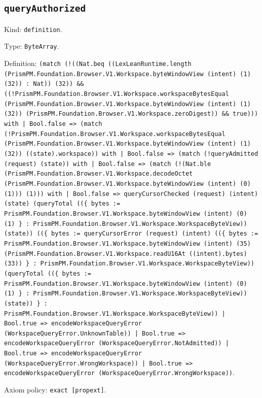 \documentclass[11pt]{article}
\begin{document}
\subsection*{\texttt{queryAuthorized}}
\noindent Kind: \texttt{definition}.\par
\noindent Type: \texttt{ByteArray}.\par
\noindent Definition: \texttt{(match (!((Nat.beq ((LexLeanRuntime.length (PrismPM.Foundation.Browser.V1.Workspace.byteWindowView (intent) (1) (32)) : Nat)) (32)) \&\& ((!PrismPM.Foundation.Browser.V1.Workspace.workspaceBytesEqual (PrismPM.Foundation.Browser.V1.Workspace.byteWindowView (intent) (1) (32)) (PrismPM.Foundation.Browser.V1.Workspace.zeroDigest)) \&\& true))) with | Bool.false => (match (!PrismPM.Foundation.Browser.V1.Workspace.workspaceBytesEqual (PrismPM.Foundation.Browser.V1.Workspace.byteWindowView (intent) (1) (32)) ((state).workspace)) with | Bool.false => (match (!queryAdmitted (request) (state)) with | Bool.false => (match (!(Nat.ble (PrismPM.Foundation.Browser.V1.Workspace.decodeOctet (PrismPM.Foundation.Browser.V1.Workspace.byteWindowView (intent) (0) (1))) (1))) with | Bool.false => queryCursorChecked (request) (intent) (state) (queryTotal ((\{ bytes := PrismPM.Foundation.Browser.V1.Workspace.byteWindowView (intent) (0) (1) \} : PrismPM.Foundation.Browser.V1.Workspace.WorkspaceByteView)) (state)) ((\{ bytes := queryCursorError (request) (intent) ((\{ bytes := PrismPM.Foundation.Browser.V1.Workspace.byteWindowView (intent) (35) (PrismPM.Foundation.Browser.V1.Workspace.readU16At ((intent).bytes) (33)) \} : PrismPM.Foundation.Browser.V1.Workspace.WorkspaceByteView)) (queryTotal ((\{ bytes := PrismPM.Foundation.Browser.V1.Workspace.byteWindowView (intent) (0) (1) \} : PrismPM.Foundation.Browser.V1.Workspace.WorkspaceByteView)) (state)) \} : PrismPM.Foundation.Browser.V1.Workspace.WorkspaceByteView)) | Bool.true => encodeWorkspaceQueryError (WorkspaceQueryError.UnknownTable)) | Bool.true => encodeWorkspaceQueryError (WorkspaceQueryError.NotAdmitted)) | Bool.true => encodeWorkspaceQueryError (WorkspaceQueryError.WrongWorkspace)) | Bool.true => encodeWorkspaceQueryError (WorkspaceQueryError.WrongWorkspace))}.\par
\noindent Axiom policy: \texttt{exact [propext]}.\par
\end{document}
